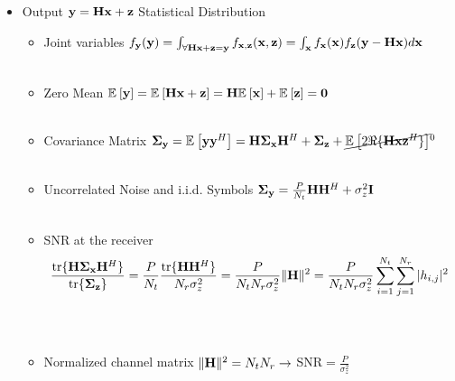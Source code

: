 \documentclass[xcolor=dvipsnames,aspectratio=169]{beamer}
\begin{document}
{\begin{itemize}
\begin{itemize}
$${\begin{array}{cccc}
                                               \vdots&\vdots&\ddots &\vdots\\
                                                x_{N_{t}}x_1^*&x_{N_{t}}x_2^*&\dots &|x_{N_{t}}|^2\\
                                               \end{array} \right)}$$
        \item I.I.D. Transmitted Signal $\Ex{}{x_2x_1^*}=0\Rightarrow \Sg_{\x}=\frac{P}{N_{t}}\I$\\ \ \\
        \item Example: Select $x_i$ from $N_{t}$ independent QPSK constellations.\\ \ \\
    \end{itemize}
    \pagebreak
    \item Output $\mathbf{y}=\mathbf{H} \mathbf{x} +\mathbf{z}$ Statistical Distribution
    \begin{itemize}
        \item Joint variables $f_{\mathbf{y}}(\mathbf{y})=\int_{\forall \mathbf{H}\mathbf{x}+\mathbf{z}=\mathbf{y}}f_{\mathbf{x},\mathbf{z}}(\mathbf{x},\mathbf{z})=\int_{\mathbf{x}} f_{\mathbf{x}}(\mathbf{x})f_{\mathbf{z}}(\mathbf{y}-\mathbf{H}\mathbf{x})d\mathbf{x}$ \\ \ \\
        \item Zero Mean ${\mathbb{E}_{}\left[\mathbf{y}\right]}={\mathbb{E}_{}\left[\mathbf{H}\mathbf{x}+\mathbf{z}\right]}=\mathbf{H}{\mathbb{E}_{}\left[\mathbf{x}\right]}+{\mathbb{E}_{}\left[\mathbf{z}\right]}=\mathbf{0}$\\ \ \\
        \item Covariance Matrix $\mathbf{\boldsymbol{\Sigma}}_{\mathbf{y}}={\mathbb{E}_{}\left[\mathbf{y} \mathbf{y}^H\right]}=\mathbf{H}\mathbf{\boldsymbol{\Sigma}}_{\mathbf{x}}\mathbf{H}^H+\mathbf{\boldsymbol{\Sigma}}_{\mathbf{z}}+\cancel{{\mathbb{E}_{}\left[2\Re\{\mathbf{H}\mathbf{x}\mathbf{z}^H\}\right]}}^{0}$\\ \ \\
        \item Uncorrelated Noise and i.i.d. Symbols $\mathbf{\boldsymbol{\Sigma}}_{\mathbf{y}}=\frac{P}{N_{t}}\mathbf{H}\mathbf{H}^H+\sigma_z^2\mathbf{I}$\\ \ \\
        \item SNR at the receiver 
        $$\frac{\textnormal{tr}\{\mathbf{H}\mathbf{\boldsymbol{\Sigma}}_{\mathbf{x}}\mathbf{H}^H\}}{\textnormal{tr}\{\mathbf{\boldsymbol{\Sigma}}_{\mathbf{z}}\}}=\frac{P}{N_{t}}\frac{\textnormal{tr}\{\mathbf{H}\mathbf{H}^H\}}{N_{r}\sigma_z^2}=\frac{P}{N_{t}N_{r}\sigma_z^2}\|\mathbf{H}\|^2=\frac{P}{N_{t}N_{r}\sigma_z^2}\sum_{i=1}^{N_{t}}\sum_{j=1}^{N_{r}}|h_{i,j}|^2$$\\ \ \\
        \item Normalized channel matrix $\|\mathbf{H}\|^2=N_{t}N_{r}\to$ SNR$=\frac{P}{\sigma_z^2}$
    \end{itemize}
 \end{itemize}
}
\end{document}
